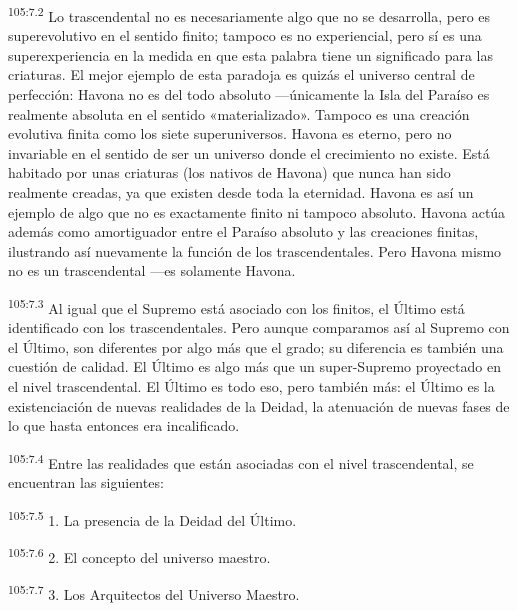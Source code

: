 \par
\textsuperscript{105:7.2} Lo trascendental no es necesariamente algo que no se desarrolla, pero es superevolutivo en el sentido finito; tampoco es no experiencial, pero sí es una superexperiencia en la medida en que esta palabra tiene un significado para las criaturas. El mejor ejemplo de esta paradoja es quizás el universo central de perfección: Havona no es del todo absoluto ---únicamente la Isla del Paraíso es realmente absoluta en el sentido «materializado». Tampoco es una creación evolutiva finita como los siete superuniversos. Havona es eterno, pero no invariable en el sentido de ser un universo donde el crecimiento no existe. Está habitado por unas criaturas (los nativos de Havona) que nunca han sido realmente creadas, ya que existen desde toda la eternidad. Havona es así un ejemplo de algo que no es exactamente finito ni tampoco absoluto. Havona actúa además como amortiguador entre el Paraíso absoluto y las creaciones finitas, ilustrando así nuevamente la función de los trascendentales. Pero Havona mismo no es un trascendental ---es solamente Havona.

\par
\textsuperscript{105:7.3} Al igual que el Supremo está asociado con los finitos, el Último está identificado con los trascendentales. Pero aunque comparamos así al Supremo con el Último, son diferentes por algo más que el grado; su diferencia es también una cuestión de calidad. El Último es algo más que un super-Supremo proyectado en el nivel trascendental. El Último es todo eso, pero también más: el Último es la existenciación de nuevas realidades de la Deidad, la atenuación de nuevas fases de lo que hasta entonces era incalificado.

\par
\textsuperscript{105:7.4} Entre las realidades que están asociadas con el nivel trascendental, se encuentran las siguientes:

\par
\textsuperscript{105:7.5} 1. La presencia de la Deidad del Último.

\par
\textsuperscript{105:7.6} 2. El concepto del universo maestro.

\par
\textsuperscript{105:7.7} 3. Los Arquitectos del Universo Maestro.

